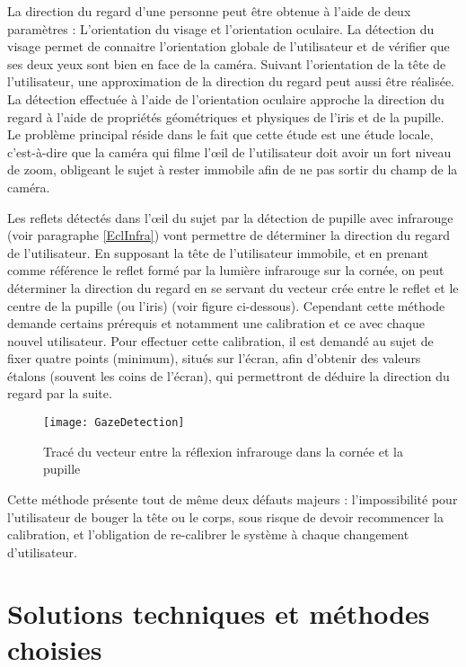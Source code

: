 La direction du regard d’une personne peut être obtenue à l’aide de deux paramètres : 
L’orientation du visage et l’orientation oculaire. La détection du visage permet de connaitre l’orientation globale de l’utilisateur et de vérifier que ses deux yeux sont bien en face de la caméra. Suivant l’orientation de la tête de l’utilisateur, une approximation de la direction du regard peut aussi être réalisée.
La détection effectuée à l’aide de l’orientation oculaire approche la direction du regard à l’aide de propriétés géométriques et physiques de l’iris et de la pupille. Le problème principal réside dans le fait que cette étude est une étude locale, c’est-à-dire que la caméra qui filme l’œil de l’utilisateur doit avoir un fort niveau de zoom, obligeant le sujet à rester immobile afin de ne pas sortir du champ de la caméra.

Les reflets détectés dans l’œil du sujet par la détection de pupille avec infrarouge (voir paragraphe \ref{EclInfra}) vont permettre de déterminer la direction du regard de l’utilisateur. En supposant la tête de l’utilisateur immobile, et en prenant comme référence le reflet formé par la lumière infrarouge sur la cornée, on peut déterminer la direction du regard en se servant du vecteur crée entre le reflet et le centre de la pupille (ou l’iris) (voir figure ci-dessous). Cependant cette méthode demande certains prérequis et notamment une calibration et ce avec chaque nouvel utilisateur. Pour effectuer cette calibration, il est demandé au sujet de fixer quatre points (minimum), situés sur l’écran, afin d’obtenir des valeurs étalons (souvent les coins de l’écran), qui permettront de déduire la direction du regard par la suite.

\begin{figure}[H]
  \centering
  \texttt{[image: GazeDetection]}
  \caption{Tracé du vecteur entre la réflexion infrarouge dans la cornée et la pupille}
  \label{fig:GazeDetection}
\end{figure}

Cette méthode présente tout de même deux défauts majeurs : l’impossibilité pour l’utilisateur de bouger la tête ou le corps, sous risque de devoir recommencer la calibration, et l’obligation de re-calibrer le système à chaque changement d’utilisateur.

\section{Solutions techniques et méthodes choisies} 

